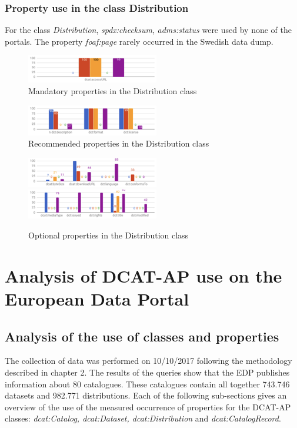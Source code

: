 \documentclass[<options>]{elsarticle}
\begin{document}
\subsubsection{Property use in the class Distribution}
For the class \textit{Distribution}, \textit{spdx:checksum}, \textit{adms:status} were used by none of the portals. The property \textit{foaf:page} rarely occurred in the Swedish data dump.

\begin{figure}[!h]
\includegraphics{replace12.png}
\caption{Mandatory properties in the Distribution class}
\end{figure}

\begin{figure}[!h]
\includegraphics{replace13.png}
\caption{Recommended properties in the Distribution class}
\end{figure}

\begin{figure}[!h]
\includegraphics{replace14.png}
\includegraphics{replace15.png}
\caption{Optional properties in the Distribution class}
\end{figure}

\section{Analysis of DCAT-AP use on the European Data Portal}

\subsection{Analysis of the use of classes and properties}
The collection of data was performed on 10/10/2017 following the methodology described in chapter 2. The results of the queries show that the EDP publishes information about 80 catalogues. These catalogues contain all together 743.746 datasets and 982.771 distributions. Each of the following sub-sections gives an overview of the use of the measured occurrence of properties for the DCAT-AP classes: \textit{dcat:Catalog, dcat:Dataset, dcat:Distribution} and \textit{dcat:CatalogRecord}.
\end{document}
